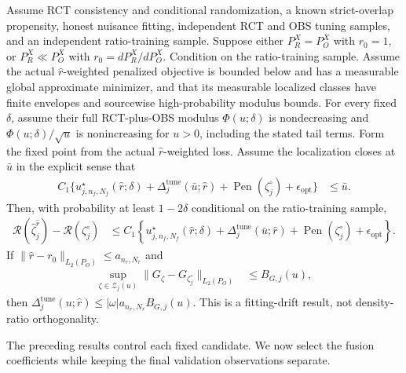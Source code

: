 \begin{proposition}
\label{prop:cate-general-estimated-r}
Assume RCT consistency and conditional randomization, a known strict-overlap
propensity, honest nuisance fitting, independent RCT and OBS tuning samples,
and an independent ratio-training sample. Suppose either
$P_R^X=P_O^X$ with $r_0=1$, or $P_R^X\ll P_O^X$ with
$r_0=dP_R^X/dP_O^X$. Condition on the ratio-training sample. Assume the
actual $\widehat r$-weighted penalized objective is
bounded below and has a measurable global approximate minimizer, and that its
measurable localized classes have finite envelopes and sourcewise
high-probability modulus bounds. For every fixed $\delta$, assume their full
RCT-plus-OBS modulus $\Phi(u;\delta)$ is nondecreasing and
$\Phi(u;\delta)/\sqrt u$ is nonincreasing for $u>0$, including the stated
tail terms. Form the fixed point from the actual $\widehat r$-weighted loss.
Assume the localization closes at $\bar u$ in the explicit sense that
\begin{align*}
C_1\{u_{j,n_f,N_f}^\star(\widehat r;\delta)
+\Delta_j^{\mathrm{tune}}(\bar u;\widehat r)
+\operatorname{Pen}(\zeta_j^\circ)+\epsilon_{\mathrm{opt}}\}
&\leq\bar u.
\end{align*}
Then, with probability at least $1-2\delta$ conditional on the
ratio-training sample,
\begin{align*}
\mathcal R(\widehat\zeta_j^{\widehat r})-
\mathcal R(\zeta_j^\circ)
&\leq C_1\left\{
u_{j,n_f,N_f}^\star(\widehat r;\delta)
+\Delta_j^{\mathrm{tune}}(\bar u;\widehat r)
+\operatorname{Pen}(\zeta_j^\circ)
+\epsilon_{\mathrm{opt}}\right\}.
\end{align*}
If $\|\widehat r-r_0\|_{L_2(P_O)}\leq a_{n_r,N_r}$ and
\begin{align*}
\sup_{\zeta\in\mathcal Z_j(u)}
\|G_\zeta-G_{\zeta_j^\circ}\|_{L_2(P_O)}
&\leq B_{G,j}(u),
\end{align*}
then
$\Delta_j^{\mathrm{tune}}(u;\widehat r)
\leq|\omega|a_{n_r,N_r}B_{G,j}(u)$.
This is a fitting-drift result, not density-ratio orthogonality.
\end{proposition}

The preceding results control each fixed candidate.  We now select the fusion
coefficients while keeping the final validation observations separate.


